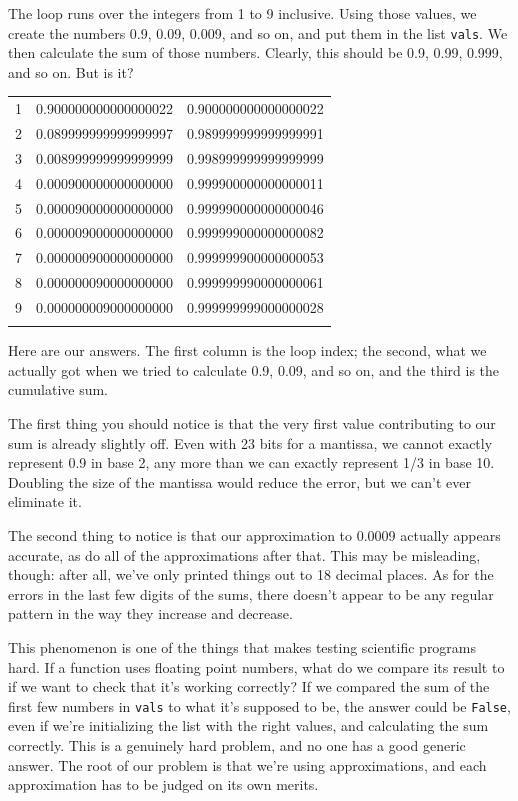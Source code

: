 \documentclass{book}
\begin{document}
The loop runs over the integers from 1 to 9 inclusive. Using those
values, we create the numbers 0.9, 0.09, 0.009, and so on, and put them
in the list \texttt{vals}. We then calculate the sum of those numbers.
Clearly, this should be 0.9, 0.99, 0.999, and so on. But is it?

\begin{tabular}{@{}lll@{}}
\hline\noalign{\medskip}
1 & 0.900000000000000022 & 0.900000000000000022
\\\noalign{\medskip}
2 & 0.089999999999999997 & 0.989999999999999991
\\\noalign{\medskip}
3 & 0.008999999999999999 & 0.998999999999999999
\\\noalign{\medskip}
4 & 0.000900000000000000 & 0.999900000000000011
\\\noalign{\medskip}
5 & 0.000090000000000000 & 0.999990000000000046
\\\noalign{\medskip}
6 & 0.000009000000000000 & 0.999999000000000082
\\\noalign{\medskip}
7 & 0.000000900000000000 & 0.999999900000000053
\\\noalign{\medskip}
8 & 0.000000090000000000 & 0.999999990000000061
\\\noalign{\medskip}
9 & 0.000000009000000000 & 0.999999999000000028
\\\noalign{\medskip}
\hline
\end{tabular}

Here are our answers. The first column is the loop index; the second,
what we actually got when we tried to calculate 0.9, 0.09, and so on,
and the third is the cumulative sum.

The first thing you should notice is that the very first value
contributing to our sum is already slightly off. Even with 23 bits for a
mantissa, we cannot exactly represent 0.9 in base 2, any more than we
can exactly represent 1/3 in base 10. Doubling the size of the mantissa
would reduce the error, but we can't ever eliminate it.

The second thing to notice is that our approximation to 0.0009 actually
appears accurate, as do all of the approximations after that. This may
be misleading, though: after all, we've only printed things out to 18
decimal places. As for the errors in the last few digits of the sums,
there doesn't appear to be any regular pattern in the way they increase
and decrease.

This phenomenon is one of the things that makes testing scientific
programs hard. If a function uses floating point numbers, what do we
compare its result to if we want to check that it's working correctly?
If we compared the sum of the first few numbers in \texttt{vals} to what
it's supposed to be, the answer could be \texttt{False}, even if we're
initializing the list with the right values, and calculating the sum
correctly. This is a genuinely hard problem, and no one has a good
generic answer. The root of our problem is that we're using
approximations, and each approximation has to be judged on its own
merits.
\end{document}

